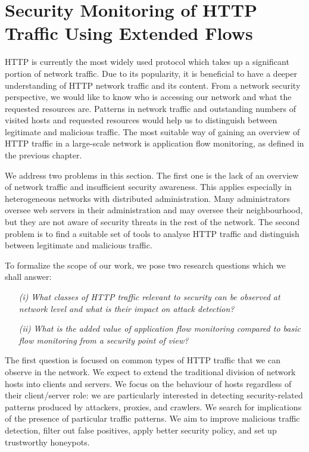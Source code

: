 \newpage

\section{Security Monitoring of HTTP Traffic Using Extended Flows}\label{sec:analysis-http-flows}

HTTP is currently the most widely used protocol which takes up a significant portion of network traffic. Due to its popularity, it is beneficial to have a deeper understanding of HTTP network traffic and its content. From a network security perspective, we would like to know who is accessing our network and what the requested resources are. Patterns in network traffic and outstanding numbers of visited hosts and requested resources would help us to distinguish between legitimate and malicious traffic. The most suitable way of gaining an overview of HTTP traffic in a large-scale network is application flow monitoring, as defined in the previous chapter.

We address two problems in this section. The first one is the lack of an overview of network traffic and insufficient security awareness. This applies especially in heterogeneous networks with distributed administration. Many administrators oversee web servers in their administration and may oversee their neighbourhood, but they are not aware of security threats in the rest of the network. The second problem is to find a suitable set of tools to analyse HTTP traffic and distinguish between legitimate and malicious traffic.

To formalize the scope of our work, we pose two research questions which we shall answer:
\begin{itemize}
\item[\emph{(i)}] \emph{What classes of HTTP traffic relevant to security can be observed at network level and what is their impact on attack detection?}
\item[\emph{(ii)}] \emph{What is the added value of application flow monitoring compared to basic flow monitoring from a security point of view?}
\end{itemize}

The first question is focused on common types of HTTP traffic that we can observe in the network. We expect to extend the traditional division of network hosts into clients and servers. We focus on the behaviour of hosts regardless of their client/server role: we are particularly interested in detecting security-related patterns produced by attackers, proxies, and crawlers. We search for implications of the presence of particular traffic patterns. We aim to improve malicious traffic detection, filter out false positives, apply better security policy, and set up trustworthy honeypots.

